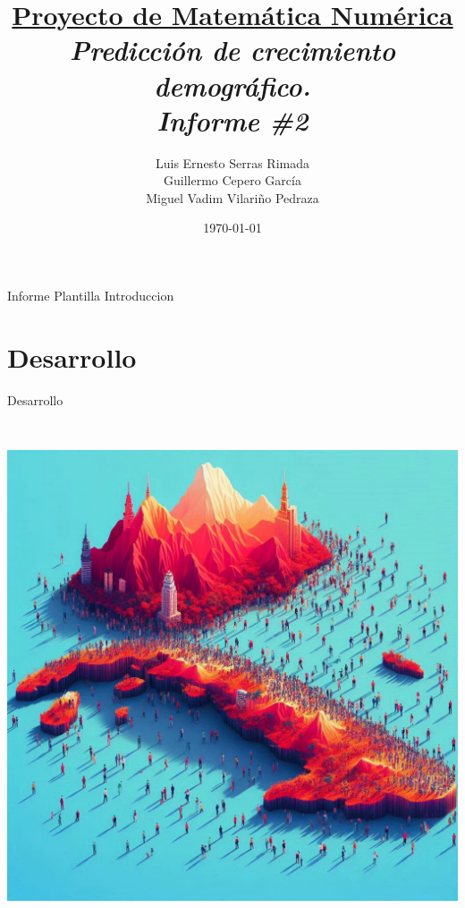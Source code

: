 \documentclass{article}
\title{\textbf{\underline{Proyecto de Matemática Numérica}} \\ \textit{Predicción de crecimiento demográfico.} \\ \textit{Informe \#2}}
\author{Luis Ernesto Serras Rimada \\ Guillermo Cepero García \\ Miguel Vadim Vilariño Pedraza}
\date{\today}
\begin{document}
\maketitle
    Informe Plantilla
    \tableofcontents
    \lstlistoflistings
    Introduccion
\newpage
\section{Desarrollo}
Desarrollo\\
\begin{center}
\includegraphics[height = 15cm]{img/cuba3.jpeg}

\end{center}
\newpage
\end{document}
